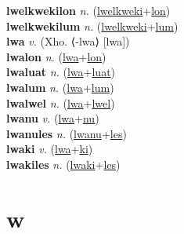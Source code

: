 \textbf{lwelkwekilon} \textit{n.} (\hyperref[lwelkweki]{lwelkweki}+\hyperref[lon]{lon})
 \label{lwelkwekilon} \\
\textbf{lwelkwekilum} \textit{n.} (\hyperref[lwelkweki]{lwelkweki}+\hyperref[lum]{lum})
 \label{lwelkwekilum} \\
\textbf{lwa} \textit{v.} (Xho. ⟨-lwa⟩ [lwa])
 \label{lwa} \\
\textbf{lwalon} \textit{n.} (\hyperref[lwa]{lwa}+\hyperref[lon]{lon})
 \label{lwalon} \\
\textbf{lwaluat} \textit{n.} (\hyperref[lwa]{lwa}+\hyperref[luat]{luat})
 \label{lwaluat} \\
\textbf{lwalum} \textit{n.} (\hyperref[lwa]{lwa}+\hyperref[lum]{lum})
 \label{lwalum} \\
\textbf{lwalwel} \textit{n.} (\hyperref[lwa]{lwa}+\hyperref[lwel]{lwel})
 \label{lwalwel} \\
\textbf{lwanu} \textit{v.} (\hyperref[lwa]{lwa}+\hyperref[nu]{nu})
 \label{lwanu} \\
\textbf{lwanules} \textit{n.} (\hyperref[lwanu]{lwanu}+\hyperref[les]{les})
 \label{lwanules} \\
\textbf{lwaki} \textit{v.} (\hyperref[lwa]{lwa}+\hyperref[ki]{ki})
 \label{lwaki} \\
\textbf{lwakiles} \textit{n.} (\hyperref[lwaki]{lwaki}+\hyperref[les]{les})
 \label{lwakiles} 

\section{w}


